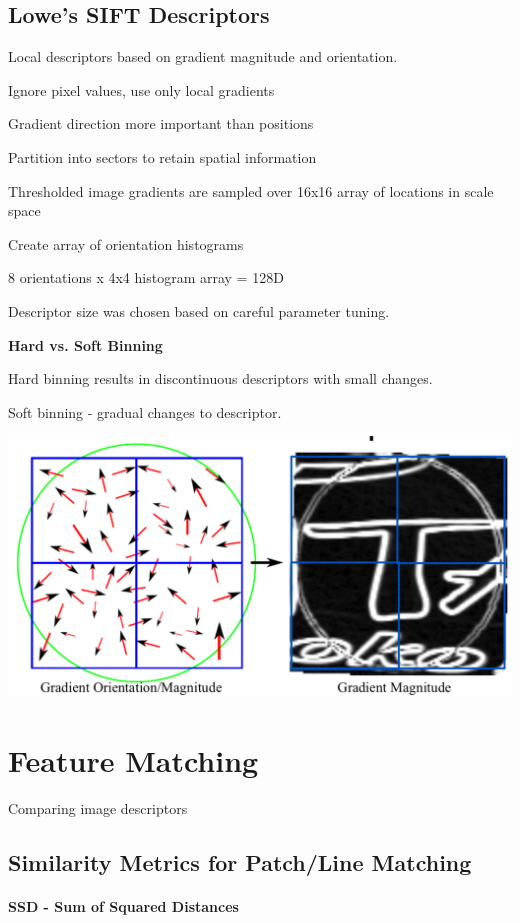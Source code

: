 \begin{enumerate}
\subsection{Lowe's SIFT Descriptors}

Local descriptors based on gradient magnitude and orientation.

Ignore pixel values, use only local gradients

Gradient direction more important than positions

Partition into sectors to retain spatial information

Thresholded image gradients are sampled over 16x16 array of locations in scale space

Create array of orientation histograms

8 orientations x 4x4 histogram array = 128D

Descriptor size was chosen based on careful parameter tuning. 


\textbf{Hard vs. Soft Binning}

Hard binning results in discontinuous descriptors with small changes.

Soft binning - gradual changes to descriptor.

\includegraphics[width=0.9\columnwidth]{cv_figures/lowe.png}

\section{Feature Matching}

Comparing image descriptors

\subsection{ Similarity Metrics for Patch/Line Matching}

\paragraph*{ SSD - Sum of Squared Distances}


\end{enumerate}
